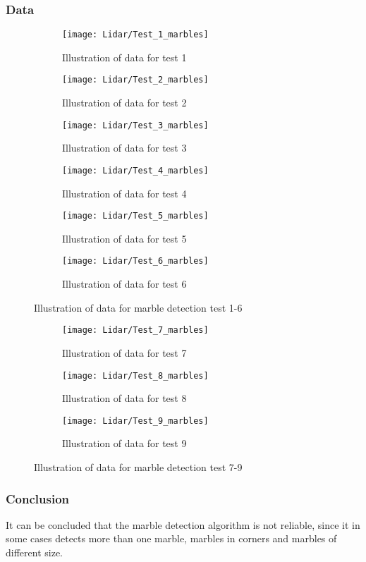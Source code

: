 \documentclass[../Head/Main.tex]{subfiles}
\begin{document}
\subsubsection*{Data}
\begin{figure}[H]
  \begin{subfigure}[b]{0.3\textwidth}
  	\centering
    \texttt{[image: Lidar/Test\_1\_marbles]}
    \caption{Illustration of data for test 1}
    \label{fig:Marbletest1}
  \end{subfigure}
  \hfill
  \begin{subfigure}[b]{0.3\textwidth}
  	\centering
    \texttt{[image: Lidar/Test\_2\_marbles]}
    \caption{Illustration of data for test 2}
    \label{fig:Marblestest2}
  \end{subfigure}
  \hfill
  \begin{subfigure}[b]{0.3\textwidth}
    \centering
    \texttt{[image: Lidar/Test\_3\_marbles]}
    \caption{Illustration of data for test 3}
    \label{fig:Marblestest3}
  \end{subfigure}
  \hfill
  \begin{subfigure}[b]{0.3\textwidth}
    \centering
    \texttt{[image: Lidar/Test\_4\_marbles]}
    \caption{Illustration of data for test 4}
    \label{fig:Marblestest4}
  \end{subfigure}
  \hfill
  \begin{subfigure}[b]{0.3\textwidth}
    \centering
    \texttt{[image: Lidar/Test\_5\_marbles]}
    \caption{Illustration of data for test 5}
    \label{fig:Marblestest5}
  \end{subfigure}
  \hfill
  \begin{subfigure}[b]{0.3\textwidth}
    \centering
    \texttt{[image: Lidar/Test\_6\_marbles]}
    \caption{Illustration of data for test 6}
    \label{fig:Marblestest6}
  \end{subfigure}
  \caption{Illustration of data for marble detection test 1-6}
  \label{fig:Marblestests16}
\end{figure}
\begin{figure}[H]
  \begin{subfigure}[b]{0.3\textwidth}
    \centering
    \texttt{[image: Lidar/Test\_7\_marbles]}
    \caption{Illustration of data for test 7}
    \label{fig:Marblestest7}
  \end{subfigure}
  \hfill
  \begin{subfigure}[b]{0.3\textwidth}
    \centering
    \texttt{[image: Lidar/Test\_8\_marbles]}
    \caption{Illustration of data for test 8}
    \label{fig:Marblestest8}
  \end{subfigure}
  \hfill
  \begin{subfigure}[b]{0.3\textwidth}
    \centering
    \texttt{[image: Lidar/Test\_9\_marbles]}
    \caption{Illustration of data for test 9}
    \label{fig:Marblestest9}
  \end{subfigure}
  \caption{Illustration of data for marble detection test 7-9}
  \label{fig:Marblestests79}
\end{figure}

\subsubsection*{Conclusion}
It can be concluded that the marble detection algorithm is not reliable, since it in some cases detects more than one marble, marbles in corners and marbles of different size.
\end{document}
